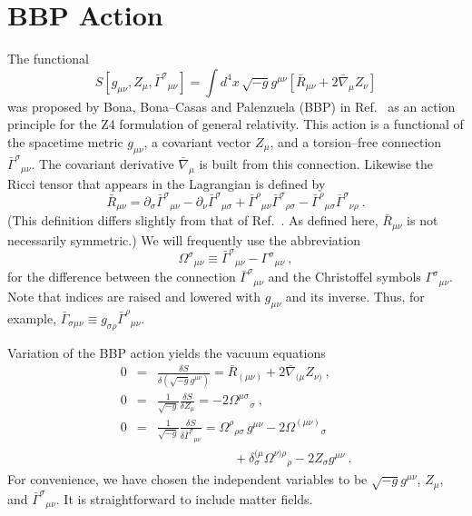 \documentclass[letterpaper,nofootinbib,prd,amsmath,twocolumn]{revtex4-1}
\begin{document}
\section{BBP Action}\label{section3}
The functional 
\begin{equation}\label{Z4action}
  S[g_{\mu\nu},Z_\mu,\bar\Gamma^\sigma{}_{\mu\nu}] = \int d^4x \, \sqrt{-g} g^{\mu\nu} \left[ \bar R_{\mu\nu}
   + 2\bar\nabla_\mu Z_\nu \right] 
\end{equation}
was proposed by Bona, Bona--Casas and Palenzuela (BBP) in Ref.~\cite{Bona:2010is} as an 
action principle for the Z4 formulation of general relativity.
This action is a functional of the spacetime metric $g_{\mu\nu}$, a covariant vector $Z_\mu$, and a 
torsion--free  connection $\bar\Gamma^\sigma{}_{\mu\nu}$. The covariant derivative 
$\bar\nabla_\mu$ is built from this connection. Likewise the Ricci tensor that appears in the Lagrangian 
is defined by 
\begin{equation}\label{Rbardef}
	\bar R_{\mu\nu} = \partial_\sigma \bar\Gamma^\sigma{}_{\mu\nu} - \partial_\nu \bar\Gamma^\sigma{}_{\mu\sigma} 
	+ \bar\Gamma^\rho{}_{\mu\nu} \bar\Gamma^\sigma{}_{\rho\sigma} 
	- \bar\Gamma^\rho{}_{\mu\sigma} \bar\Gamma^\sigma{}_{\nu\rho} \ .
\end{equation}
(This definition differs slightly from that of Ref.~\cite{Bona:2010is}. As defined here, $\bar R_{\mu\nu}$ is not 
necessarily symmetric.) We will frequently use the abbreviation 
\begin{equation}\label{Omegadef}
    \Omega^\sigma{}_{\mu\nu}  \equiv  \bar\Gamma^\sigma{}_{\mu\nu} - \Gamma^\sigma{}_{\mu\nu}   \ ,
\end{equation}
for the difference between the connection $\bar\Gamma^\sigma{}_{\mu\nu}$ and the Christoffel symbols 
$\Gamma^\sigma{}_{\mu\nu}$. 
Note that indices are raised and lowered with $g_{\mu\nu}$ and 
its inverse. Thus, for example, $\bar\Gamma_{\sigma\mu\nu} \equiv g_{\sigma\rho}\bar\Gamma^\rho{}_{\mu\nu}$. 

Variation of the BBP action yields the vacuum equations
\begin{subequations}\label{Z4equations}
  \begin{eqnarray}
   0 & = & \frac{\delta S}{\delta(\sqrt{-g} g^{\mu\nu})} = \bar R_{(\mu\nu)} + 2\bar\nabla_{(\mu} Z_{\nu)} \ ,\\
   0 & = & \frac{1}{\sqrt{-g}}\frac{\delta S}{\delta Z_\mu} = -2 \Omega^{\mu\sigma}{}_\sigma \ ,\\
   0 & = & \frac{1}{\sqrt{-g}}\frac{\delta S}{\delta \bar\Gamma^\sigma{}_{\mu\nu}} = \Omega^\rho{}_{\rho\sigma} \, g^{\mu\nu} 
       - 2\Omega^{(\mu\nu)}{}_\sigma \nonumber\\
       & & \qquad\qquad\qquad + \delta^{(\mu}_\sigma \Omega^{\nu)\rho}{}_\rho - 2 Z_\sigma g^{\mu\nu} \ .
\end{eqnarray}
\end{subequations}
For convenience, we have chosen the independent variables to be $\sqrt{-g}g^{\mu\nu}$, $Z_\mu$, and 
$\bar\Gamma^\sigma{}_{\mu\nu}$. It is straightforward to include matter fields. 
\end{document}
